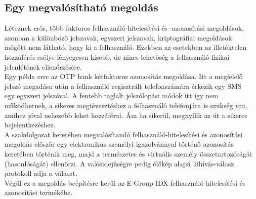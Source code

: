 \subsection{Egy megvalósítható megoldás}
Léteznek erős, több faktoros felhasználó-hitelesítési és -azonosítási megoldások, azonban a különböző jelszavak, egyszeri jelszavak, kriptográfiai megoldások mögött nem látható, hogy ki a felhasználó. Ezekben az esetekben az illetéktelen hozzáférés esélye lényegesen kisebb, de nincs lehetőség a felhasználó fizikai jelenlétének ellenőrzésére. 
\\Egy példa erre az OTP bank kétfaktoros azonosítás megoldása. Itt a megfelelő jelszó megadása után a felhasználó regisztrált telefonszámára érkezik egy SMS egy egyszeri jelszóval. A fentebb taglalt jelszólopási módok itt így nem működhetnek, a sikeres megtévesztéshez a felhasználó telefonjára is szükség van, amihez jóval nehezebb lehet hozzáférni. Ám ha sikerül, megnyílik az út a sikeres bejelentkezéshez.
\\A szakdolgozat keretében megvalósítandó felhasználó-hitelesítési és azonosítási megoldás először egy elektronikus személyi igazolvánnyal történő azonosítás keretében történik meg, majd a természetes és virtuális személy összetartozóságát (hasonlóságát) ellenőrzi. A valósidejűségre pedig élőkép alapú kihívás-válasz protokoll adja a választ.
\\Végül ez a megoldás beépítésre kerül az E-Group IDX felhasználó-hitelesítési és azonosítási termékébe.
